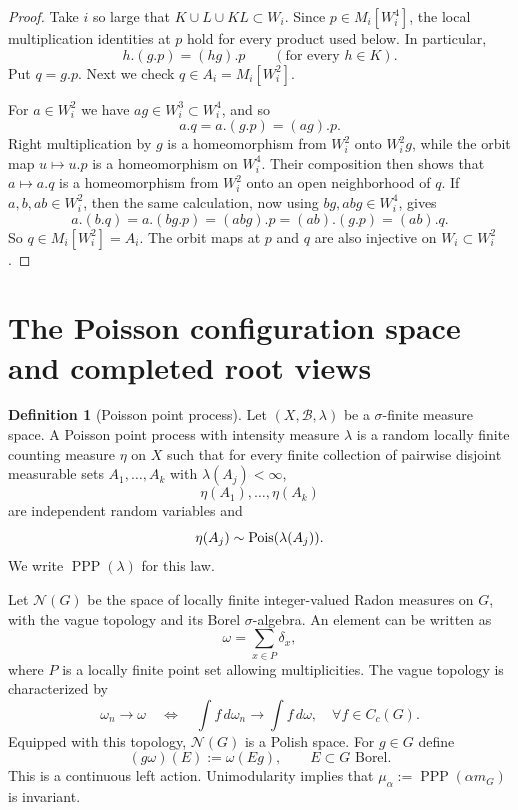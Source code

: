 \documentclass[12pt]{amsart}
\theoremstyle{definition}
\newtheorem{definition}[definition]{Definition}
\newcommand{\Haar}{m_G}
\newcommand{\PPP}{\operatorname{PPP}}
\newcommand{\cN}{\mathcal N}
\newcommand{\1}{\mathbf 1}
\begin{document}
\begin{proof}
Take $i$ so large that $K\cup L\cup KL\subset W_i$. Since $p\in M_i[W_i^4]$, the local multiplication identities at $p$ hold for every product used below. In particular,
\[
 h.(g.p)=(hg).p\qquad(\text{for every } h\in K).
\]
Put $q=g.p$. Next we check $q\in A_i=M_i[W_i^2]$.

For $a\in W_i^2$ we have $ag\in W_i^3\subset W_i^4$, and so
\[
 a.q=a.(g.p)=(ag).p.
\]
Right multiplication by $g$ is a homeomorphism from $W_i^2$ onto $W_i^2g$, while the orbit map $u\mapsto u.p$ is a homeomorphism on $W_i^4$. Their composition then shows that $a\mapsto a.q$ is a homeomorphism from $W_i^2$ onto an open neighborhood of $q$. If $a,b,ab\in W_i^2$, then the same calculation, now using $b g,abg\in W_i^4$, gives
\[
 a.(b.q)=a.(bg.p)=(abg).p=(ab).(g.p)=(ab).q.
\]
So $q\in M_i[W_i^2]=A_i$. The orbit maps at $p$ and $q$ are also injective on $W_i\subset W_i^2$.
\end{proof}

\section{The Poisson configuration space and completed root views}



\begin{definition}[Poisson point process]
	Let $(X,\mathcal B,\lambda)$ be a $\sigma$-finite measure space.
	A Poisson point process with intensity measure $\lambda$ is a random
	locally finite counting measure $\eta$ on $X$ such that for every
	finite collection of pairwise disjoint measurable sets
	$A_1,\dots,A_k$ with $\lambda(A_j)<\infty$,
	\[
	\eta(A_1),\dots,\eta(A_k)
	\]
	are independent random variables and
	\[
	\eta(A_j)\sim {\rm Pois}(\lambda(A_j)).
	\]
	We write $\PPP(\lambda)$ for this law.
\end{definition}
Let $\cN(G)$ be the space of locally finite integer-valued Radon measures on $G$, with the vague topology and its Borel $\sigma$-algebra. An element can be written as
\[
\omega = \sum_{x \in P} \delta_x,
\]
where $P$ is a locally finite point set allowing multiplicities. The vague topology is characterized by
\[
\omega_n \to \omega \quad \Leftrightarrow \quad \int f \, d\omega_n \to \int f \, d\omega, \quad \forall f \in C_c(G).
\]
Equipped with this topology, $\cN(G)$ is a Polish space. For $g\in G$ define
\begin{equation}\label{eq:right-shift}
 (g\omega)(E):=\omega(Eg),\qquad E\subset G\text{ Borel}.
\end{equation}
This is a continuous left action. Unimodularity implies that $\mu_\alpha:=\PPP(\alpha\Haar)$ is invariant.
\end{document}
